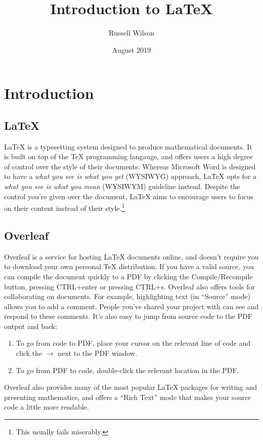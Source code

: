 \documentclass{article}
\title{Introduction to \LaTeX}
\author{Russell Wilson}
\date{August 2019}
\begin{document}
\maketitle

\section{Introduction}

\subsection{\LaTeX}

\LaTeX{} is a typesetting system designed to produce mathematical documents.
It is built on top of the \TeX{} programming langauge, and offers users a high degree of control over the style of their documents.
Whereas Microsoft Word is designed to have a \textit{what you see is what you get} (WYSIWYG) approach, \LaTeX{} opts for a \textit{what you see is what you mean} (WYSIWYM) guideline instead.
Despite the control you're given over the document, \LaTeX{} aims to encourage users to focus on their content instead of their style.\footnote{This usually fails miserably.}

\subsection{Overleaf}

Overleaf is a service for hosting \LaTeX{} documents online, and doesn't require you to download your own personal \TeX{} distribution.
If you have a valid source, you can compile the document quickly to a PDF by clicking the Compile/Recompile button, pressing CTRL+enter or pressing CTRL+s.
Overleaf also offers tools for collaborating on documents.
For example, highlighting text (in ``Source'' mode) allows you to add a comment.
People you've shared your project with can see and respond to these comments.
It's also easy to jump from source code to the PDF output and back:
\begin{enumerate}
    \item To go from code to PDF, place your cursor on the relevant line of code and click the $\rightarrow$ next to the PDF window.
    \item To go from PDF to code, double-click the relevant location in the PDF.
\end{enumerate}
Overleaf also provides many of the most popular \LaTeX{} packages for writing and presenting mathematics, and offers a ``Rich Text'' mode that makes your source code a little more readable.
\end{document}
